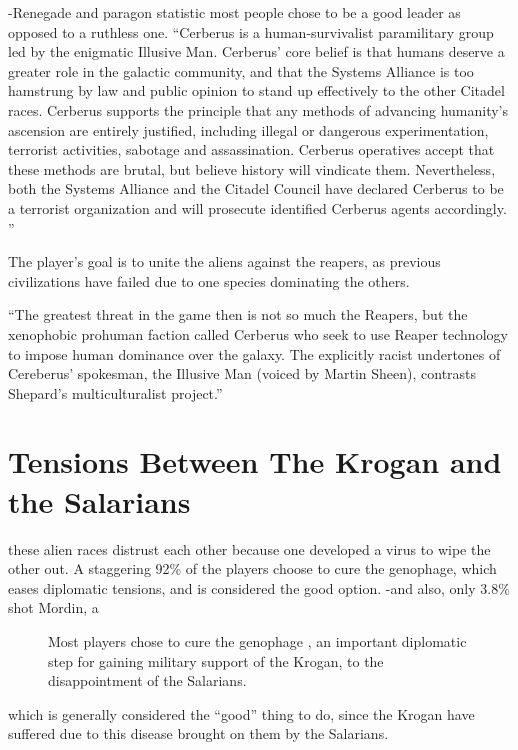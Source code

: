 \documentclass[journal]{IEEEtran}
\begin{document}
-Renegade and paragon statistic most people chose to be a good leader as opposed to a ruthless one.
``Cerberus is a human-survivalist paramilitary group led by the enigmatic Illusive Man. Cerberus' core belief is that humans deserve a greater role in the galactic community, and that the Systems Alliance is too hamstrung by law and public opinion to stand up effectively to the other Citadel races. Cerberus supports the principle that any methods of advancing humanity's ascension are entirely justified, including illegal or dangerous experimentation, terrorist activities, sabotage and assassination. Cerberus operatives accept that these methods are brutal, but believe history will vindicate them. Nevertheless, both the Systems Alliance and the Citadel Council have declared Cerberus to be a terrorist organization and will prosecute identified Cerberus agents accordingly. ''\cite{wikia}

The player's goal is to unite the aliens against the reapers, as
previous civilizations have failed due to one species dominating the others.


``The greatest threat in the game then is not so much the Reapers, but the xenophobic prohuman faction called Cerberus who seek to use Reaper technology to impose human dominance over the galaxy. The explicitly racist undertones of Cereberus’ spokesman, the Illusive Man (voiced by Martin Sheen), contrasts Shepard’s multiculturalist project.''\cite{chrisb}


\section{Tensions Between The Krogan and the Salarians}
these alien races distrust each other because one developed a virus to wipe the
other out. A staggering 92\% of the players choose to cure the genophage, which
eases diplomatic tensions, and is considered the good option. -and also,
only 3.8\% shot Mordin, a
\begin{figure}
 \begin{adjustbox}{width=.4\textwidth}
 \end{adjustbox}
 \caption{Most players chose to cure the genophage \cite{ea}, an important diplomatic step for gaining military support of the Krogan, to the disappointment of the Salarians.}
\end{figure}
which is generally considered the ``good'' thing to do, since the Krogan have suffered due to this disease brought on them by the Salarians.
\end{document}
